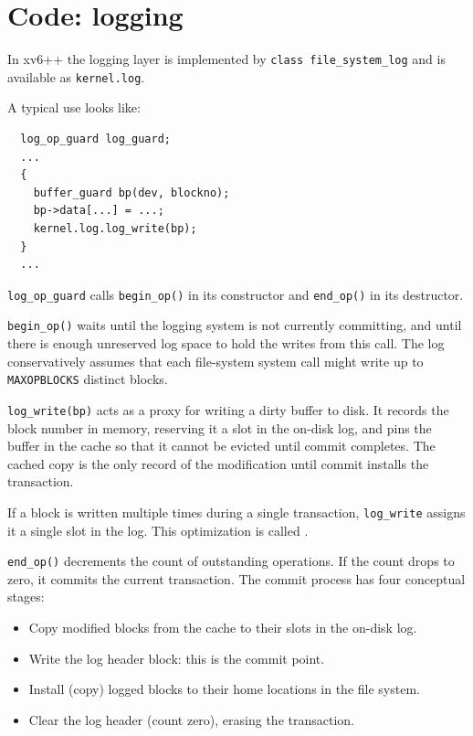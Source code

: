 \section{Code: logging}

In xv6++ the logging layer is implemented by
\lstinline{class file_system_log}
and is available as
\lstinline{kernel.log}.

A typical use looks like:

\begin{lstlisting}
  log_op_guard log_guard;
  ...
  {
    buffer_guard bp(dev, blockno);
    bp->data[...] = ...;
    kernel.log.log_write(bp);
  }
  ...
\end{lstlisting}

\lstinline{log_op_guard} calls \lstinline{begin_op()} in its constructor and
\lstinline{end_op()} in its destructor.

\lstinline{begin_op()} waits until the logging system is not currently committing,
and until there is enough unreserved log space to hold the writes from this call.
The log conservatively assumes that each file-system system call
might write up to
\lstinline{MAXOPBLOCKS}
distinct blocks.

\lstinline{log_write(bp)} acts as a proxy for writing a dirty buffer to disk. It
records the block number in memory, reserving it a slot in the on-disk log, and pins
the buffer in the cache so that it cannot be evicted until commit completes.
The cached copy is the only record of the modification until commit installs the
transaction.

If a block is written multiple times during a single transaction, \lstinline{log_write}
assigns it a single slot in the log. This optimization is called
.

\lstinline{end_op()} decrements the count of outstanding operations. If the count drops
to zero, it commits the current transaction. The commit process has four conceptual stages:

\begin{itemize}
\item Copy modified blocks from the cache to their slots in the on-disk log.
\item Write the log header block: this is the commit point.
\item Install (copy) logged blocks to their home locations in the file system.
\item Clear the log header (count zero), erasing the transaction.
\end{itemize}

